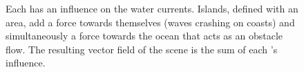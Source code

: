\begin{figure}
    \caption{Each  has an influence on the water currents. Islands, defined with an area, add a force towards themselves (waves crashing on coasts) and simultaneously a force towards the ocean that acts as an obstacle flow. The resulting vector field of the scene is the sum of each 's influence.}
    \label{fig:env-obj-island-flowfield}
\end{figure}



